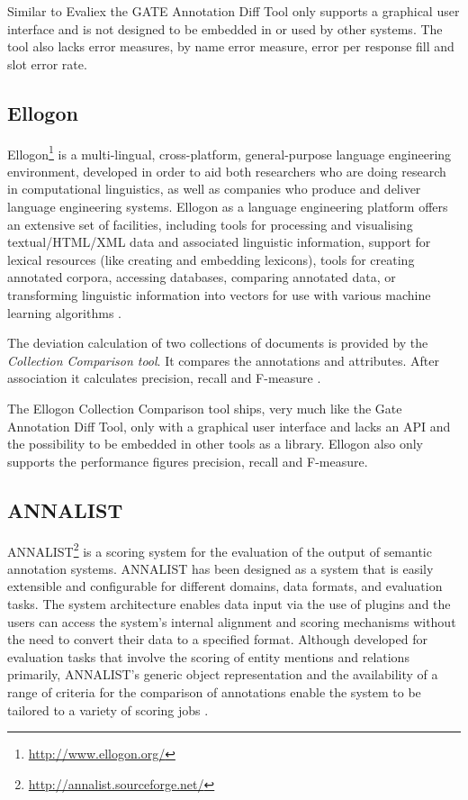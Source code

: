 Similar to Evaliex the GATE Annotation Diff Tool only supports a graphical user interface and is not designed to be embedded in or used by other systems. The tool also lacks error measures, by name error measure, error per response fill and slot error rate.

\subsection{Ellogon}
Ellogon\footnote{\url{http://www.ellogon.org/}} is a multi-lingual, cross-platform, general-purpose language engineering environment, developed in order to aid both researchers who are doing research in computational linguistics, as well as companies who produce and deliver language engineering systems. Ellogon as a language engineering platform offers an extensive set of facilities, including tools for processing and visualising textual/HTML/XML data and associated linguistic information, support for lexical resources (like creating and embedding lexicons), tools for creating annotated corpora, accessing databases, comparing annotated data, or transforming linguistic information into vectors for use with various machine learning algorithms \cite{Ellogon}.

The deviation calculation of two collections of documents is provided by the \textit{Collection Comparison tool}. It compares the annotations and attributes. After association it calculates precision, recall and F-measure \cite{Linsmayr:2010}.

The Ellogon Collection Comparison tool ships, very much like the Gate Annotation Diff Tool, only with a graphical user interface and lacks an API and the possibility to be embedded in other tools as a library. Ellogon also only supports the performance figures precision, recall and F-measure.

\subsection{ANNALIST}
\gls{ANNALIST}\footnote{\url{http://annalist.sourceforge.net/}} is a scoring system for the evaluation of the output of semantic annotation systems. ANNALIST has been designed as a system that is easily extensible and configurable for different domains, data formats, and evaluation tasks. The system architecture enables data input via the use of plugins and the users can access the system’s internal alignment and scoring mechanisms without the need to convert their data to a specified format. Although developed for evaluation tasks that involve the scoring of entity mentions and relations primarily, ANNALIST's generic object representation and the availability of a range of criteria for the comparison of annotations enable the system to be tailored to a variety of scoring jobs \cite{Demetriou:2008}.

